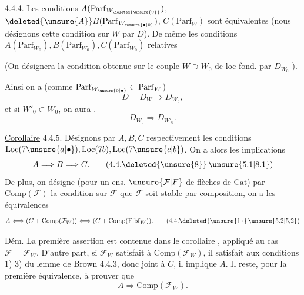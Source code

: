 
 4.4.4. Les conditions $A(\mathrm{Parf}_{W_{\deleted{\unsure{0}}}})$, $\deleted{\unsure{A}}B(\mathrm{Parf}_{W_{\unsure{\bullet|0}}})$, $C(\mathrm{Parf}_{W})$ sont équivalentes (nous désignons cette condition sur $W$ par $D$). De même les conditions $A(\mathrm{Parf}_{W_0}),B(\mathrm{Parf}_{W_0}),C(\mathrm{Parf}_{W_0})$  relatives

(On désignera la condition obtenue sur le couple $W\supset W_0$ de loc fond. par  $D_{W_0}$ ).

Ainsi on a (comme $\mathrm{Parf}_{W_{\unsure{0|\bullet}}}\subset\mathrm{Parf}_{W}$)
\[
 D=D_W\Longrightarrow D_{W_0}, \tag*{(4.4.4)}
\]
et si $W'_0\subset W_0$, on aura .
\[
 D_{W_0}\Longrightarrow D_{W'_0}. \tag*{(4.4.5)}
\]

\uline{Corollaire} 4.4.5. Désignons par $A,B,C$ respectivement les conditions $\mathrm{Loc}(7\unsure{a|\bullet}),\mathrm{Loc}(7b),\mathrm{Loc}(7\unsure{c|b})$. On a alors les implications
\[
 A\Longrightarrow B\Longrightarrow C. \tag*{(4.4.\deleted{\unsure{8}}\,\unsure{5.1|8.1})}
\]
De plus,  on désigne (pour un ens. $\unsure{\mathcal{F}|F}$ de flèches de $\mathrm{Cat}$) par $\mathrm{Comp}(\mathcal{F})$ la condition sur $\mathcal{F}$ que $\mathcal{F}$ soit stable par composition, on a les équivalences
\[
 A\Longleftrightarrow(C+\mathrm{Comp}(\mathcal{F}_{W}))
 \Longleftrightarrow(C+\mathrm{Comp}(\mathrm{Fibf}_{W})). \tag*{(4.4.\deleted{\unsure{1}}\,\unsure{5.2|5,2})}
\]

Dém. La première assertion est contenue dans le corollaire , appliqué au cas $\mathcal{F}=\mathcal{F}_{W}$. D'autre part, si $\mathcal{F}_{W}$ satisfait à $\mathrm{Comp}(\mathcal{F}_{W})$, il satisfait aux conditions 1)  3) du lemme de Brown 4.4.3, donc joint à $C$, il implique $A$.  Il reste, pour la première équivalence, à prouver que
\[
 A\Longrightarrow\mathrm{Comp}(\mathcal{F}_{W}).
\]


